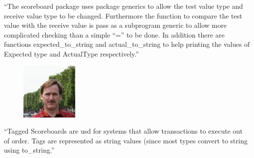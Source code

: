 \documentclass{article}
\begin{document}
\newpage
\noindent
``The scoreboard package uses package generics to allow the test value type and receive value type to 
be changed. Furthermore the function to compare the test value with the receive value is pass as a 
subprogram generic to allow more complicated checking than a simple ``='' to be done. In addition 
there are functions expected\_to\_string and actual\_to\_string to help printing the values of Expected type 
and ActualType respectively.''\\
\begin{figure}
  \centering
  \includegraphics[width=0.25\textwidth]{jl}
\end{figure}
\noindent
``Tagged Scoreboards are usd for systems that allow transactions to execute out of order. Tags are represented 
as string values (since most types convert to string using to\_string.''\\
\end{document}
